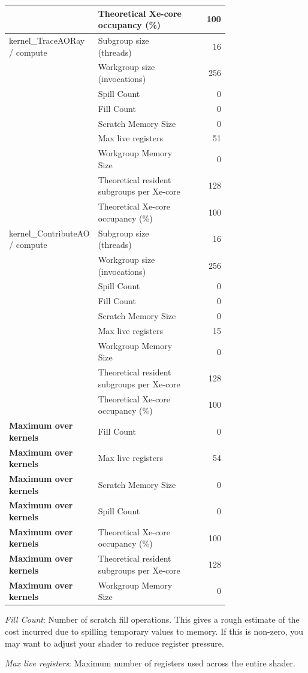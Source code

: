 \begin{longtable}{p{0.30\linewidth}p{0.43\linewidth}r}
 & Theoretical Xe-core occupancy (\%) & 100 \\
\hline
kernel\_TraceAORay / compute & Subgroup size (threads) & 16 \\
 & Workgroup size (invocations) & 256 \\
 & Spill Count & 0 \\
 & Fill Count & 0 \\
 & Scratch Memory Size & 0 \\
 & Max live registers & 51 \\
 & Workgroup Memory Size & 0 \\
 & Theoretical resident subgroups per Xe-core & 128 \\
 & Theoretical Xe-core occupancy (\%) & 100 \\
\hline
kernel\_ContributeAO / compute & Subgroup size (threads) & 16 \\
 & Workgroup size (invocations) & 256 \\
 & Spill Count & 0 \\
 & Fill Count & 0 \\
 & Scratch Memory Size & 0 \\
 & Max live registers & 15 \\
 & Workgroup Memory Size & 0 \\
 & Theoretical resident subgroups per Xe-core & 128 \\
 & Theoretical Xe-core occupancy (\%) & 100 \\
\hline
\textbf{Maximum over kernels} & Fill Count & 0 \\
\textbf{Maximum over kernels} & Max live registers & 54 \\
\textbf{Maximum over kernels} & Scratch Memory Size & 0 \\
\textbf{Maximum over kernels} & Spill Count & 0 \\
\textbf{Maximum over kernels} & Theoretical Xe-core occupancy (\%) & 100 \\
\textbf{Maximum over kernels} & Theoretical resident subgroups per Xe-core & 128 \\
\textbf{Maximum over kernels} & Workgroup Memory Size & 0 \\
\hline
\end{longtable}
\noindent\textit{Fill Count}: Number of scratch fill operations.  This gives a rough estimate of the cost incurred due to spilling temporary values to memory.  If this is non-zero, you may want to adjust your shader to reduce register pressure.\par
\noindent\textit{Max live registers}: Maximum number of registers used across the entire shader.\par
